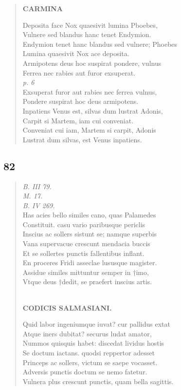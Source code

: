 \documentclass[11pt, a4paper]{report}
\begin{document}
\begin{verse}
     \marginpar{[0112]} \begin{center} \textbf{CARMINA} \end{center}Deposita face Nox quaesivit lumina Pboebes, \\ Vulnere sed blandus hanc tenet Endymion. \\ Endymion tenet hanc blandus sed vulnere; Phoebes \\ Lumina quaesivit Nox ace deposita. \\ Armipotens deus hoc suspirat pondere, vulnus \\ Ferrea nec rabies aut furor exsuperat. \\ \textit{p. 6} \\ Exsuperat furor aut rabies nec ferrea vulnus, \\ Pondere suspirat hoc deus armipotens. \\ Inpatiens Venus est, silvas dum lustrat Adonis, \\ Carpit si Martem, iam cui conveniat. \\ Conveniat cui iam, Martem si carpit, Adonis \\ Lustrat dum silvas, est Venus inpatiens. \\ 
      \end{verse}
  
            \subsection*{82}
      \begin{verse}
      \textit{B. III 79.} \\ \textit{M. 17.} \\ \textit{B. IV 269.} \\ Has acies bello similes cano, quas Palamedes \\ Constituit. casu vario paribusque periclis \\ Inscius ac sollers sistunt se; namque superbis \\ Vana supervacue crescunt mendacia buccis \\ Et se sollertes punctis fallentibus inflant. \\ En proceres Fridi asseclae lususque magister. \\ Assidue similes mittuntur semper in †imo, \\ Vtque deus †dedit, se praefert inscius artis. \\ 
        ﻿\pagebreak 
    \begin{center} \textbf{CODICIS SALMASIANI.} \end{center}Quid labor ingeniumque iuvat? cur pallidus extat \\ Atque iners dubitat? securus ludat amator, \\ Nummos quisquis habet: discedat lividus hostis \\ Se doctum iactans. quodsi reppertor adesset \\ Princeps ac sollers, victum se saepe vocasset. \\ Adversis punctis doctum se nemo fatetur. \\ Vulnera plus crescunt punctis, quam bella sagittis. \\ 
      \end{verse}
  
\end{document}
